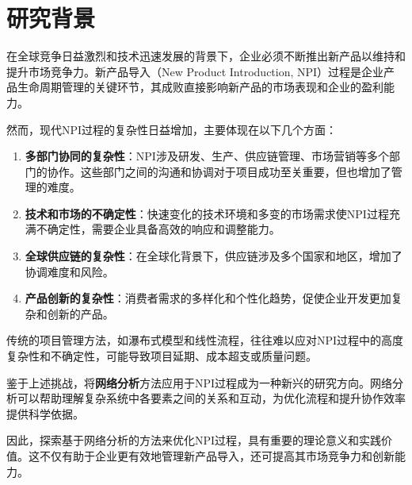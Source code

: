 \section{研究背景}

在全球竞争日益激烈和技术迅速发展的背景下，企业必须不断推出新产品以维持和提升市场竞争力。新产品导入（New Product Introduction, NPI）过程是企业产品生命周期管理的关键环节，其成败直接影响新产品的市场表现和企业的盈利能力。

然而，现代NPI过程的复杂性日益增加，主要体现在以下几个方面：

\begin{enumerate}
  \item \textbf{多部门协同的复杂性}：NPI涉及研发、生产、供应链管理、市场营销等多个部门的协作。这些部门之间的沟通和协调对于项目成功至关重要，但也增加了管理的难度\cite{clark1991product}。

  \item \textbf{技术和市场的不确定性}：快速变化的技术环境和多变的市场需求使NPI过程充满不确定性，需要企业具备高效的响应和调整能力\cite{wheelwright1992revolutionizing}。

  \item \textbf{全球供应链的复杂性}：在全球化背景下，供应链涉及多个国家和地区，增加了协调难度和风险\cite{trent2003international}。

  \item \textbf{产品创新的复杂性}：消费者需求的多样化和个性化趋势，促使企业开发更加复杂和创新的产品\cite{tidd2013managing}。
\end{enumerate}

传统的项目管理方法，如瀑布式模型和线性流程，往往难以应对NPI过程中的高度复杂性和不确定性，可能导致项目延期、成本超支或质量问题\cite{cooper1994third}。

鉴于上述挑战，将\textbf{网络分析}方法应用于NPI过程成为一种新兴的研究方向。网络分析可以帮助理解复杂系统中各要素之间的关系和互动，为优化流程和提升协作效率提供科学依据\cite{newman2010networks}。

因此，探索基于网络分析的方法来优化NPI过程，具有重要的理论意义和实践价值。这不仅有助于企业更有效地管理新产品导入，还可提高其市场竞争力和创新能力。



